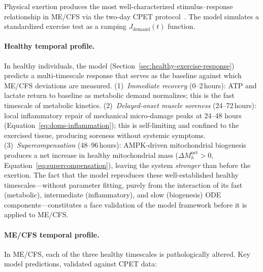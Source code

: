 Physical exertion produces the most well-characterized stimulus--response relationship in ME/CFS via the two-day CPET protocol~\cite{keller2024cpet}. The model simulates a standardized exercise test as a ramping $J_{\text{demand}}(t)$ function.

\paragraph{Healthy temporal profile.}
In healthy individuals, the model (Section~\ref{sec:healthy-exercise-response}) predicts a multi-timescale response that serves as the baseline against which ME/CFS deviations are measured. (1)~\emph{Immediate recovery} (0--2\,hours): ATP and lactate return to baseline as metabolic demand normalizes; this is the fast timescale of metabolic kinetics. (2)~\emph{Delayed-onset muscle soreness} (24--72\,hours): local inflammatory repair of mechanical micro-damage peaks at 24--48 hours (Equation~\ref{eq:doms-inflammation}); this is self-limiting and confined to the exercised tissue, producing soreness without systemic symptoms. (3)~\emph{Supercompensation} (48--96\,hours): AMPK-driven mitochondrial biogenesis produces a net increase in healthy mitochondrial mass ($\Delta M_h^{\text{net}} > 0$, Equation~\ref{eq:supercompensation}), leaving the system \emph{stronger} than before the exertion. The fact that the model reproduces these well-established healthy timescales---without parameter fitting, purely from the interaction of its fast (metabolic), intermediate (inflammatory), and slow (biogenesis) ODE components---constitutes a face validation of the model framework before it is applied to ME/CFS.

\paragraph{ME/CFS temporal profile.}
In ME/CFS, each of the three healthy timescales is pathologically altered. Key model predictions, validated against CPET data:

